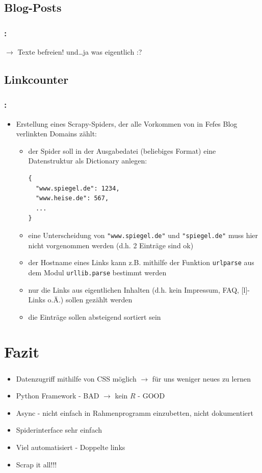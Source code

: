 \documentclass{beamer}
\begin{document}
\subsection{Blog-Posts}
\begin{frame}
	\frametitle{\insertsection{}: \insertsubsection{}}	
	$\rightarrow$ Texte befreien! und\ldots ja was eigentlich :?
\end{frame}



\subsection{Linkcounter}
\begin{frame}[fragile]
	\frametitle{\insertsection{}: \insertsubsection{}}
	\begin{itemize}
		\item Erstellung eines Scrapy-Spiders, der alle Vorkommen von in Fefes Blog
		verlinkten Domains zählt: \begin{itemize}
			\item der Spider soll in der Ausgabedatei (beliebiges Format) eine Datenstruktur als Dictionary anlegen: \begin{lstlisting} 
{
  "www.spiegel.de": 1234,
  "www.heise.de": 567,
  ...
}
			\end{lstlisting}
		\item eine Unterscheidung von \lstinline|"www.spiegel.de"| und \lstinline|"spiegel.de"| muss hier nicht vorgenommen werden (d.h. 2 Einträge sind ok)
		\item der Hostname eines Links kann z.B. mithilfe der Funktion \lstinline|urlparse| aus dem Modul \lstinline|urllib.parse| bestimmt werden
		\item nur die Links aus eigentlichen Inhalten (d.h. kein Impressum, FAQ,
		[l]-Links o.Ä.) sollen gezählt werden
		\item die Einträge sollen absteigend sortiert sein
		\end{itemize}
	\end{itemize}
\end{frame}


\section{Fazit}
\begin{frame}
	\frametitle{\insertsection{}}
	\begin{itemize}
	  \item Datenzugriff mithilfe von CSS möglich $\rightarrow$ für uns weniger
	  neues zu lernen
	  \item Python Framework - BAD $\rightarrow$ kein $R$ - GOOD
	  \item Async - nicht einfach in Rahmenprogramm einzubetten, nicht dokumentiert
	  \item Spiderinterface sehr einfach
	  \item Viel automatisiert - Doppelte links
	  \item Scrap it all!!!
	\end{itemize}
\end{frame}
\end{document}
